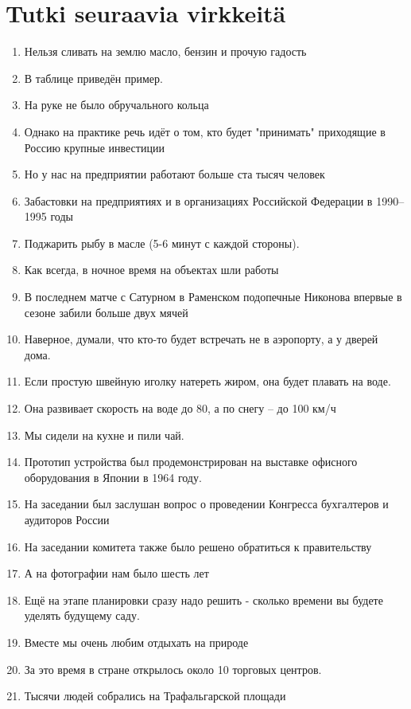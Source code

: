 \documentclass[paper=a4, fontsize=11pt]{scrartcl}
\begin{document}
\section{Tutki seuraavia virkkeitä}

\begin{enumerate}
    \item Нельзя сливать на землю масло, бензин и прочую гадость
    \item В таблице приведён пример.
    \item На руке не было обручального кольца
    \item Однако на практике речь идёт о том, кто будет "принимать" приходящие в Россию крупные инвестиции
    \item Но у нас на предприятии работают больше ста тысяч человек
    \item Забастовки на предприятиях и в организациях Российской Федерации в 1990-- 1995 годы
    \item Поджарить рыбу в масле (5-6 минут с каждой стороны).
    \item Как всегда, в ночное время на объектах шли работы
    \item В последнем матче с Сатурном в Раменском подопечные Никонова впервые в сезоне забили больше двух мячей
    \item Наверное, думали, что кто-то будет встречать не в аэропорту, а у дверей дома.
    \item Если простую швейную иголку натереть жиром, она будет плавать на воде.
    \item Она развивает скорость на воде до 80, а по снегу -- до 100 км/ч
    \item Мы сидели на кухне и пили чай.
    \item Прототип устройства был продемонстрирован на выставке офисного оборудования в Японии в 1964 году.
    \item На заседании был заслушан вопрос о проведении Конгресса бухгалтеров и аудиторов России
    \item На заседании комитета также было решено обратиться к правительству
    \item А на фотографии нам было шесть лет
    \item Ещё на этапе планировки сразу надо решить - сколько времени вы будете уделять будущему саду.
    \item Вместе мы очень любим отдыхать на природе
    \item За это время в стране открылось около 10 торговых центров.
    \item Тысячи людей собрались на Трафальгарской площади

\end{enumerate}
\end{document}
